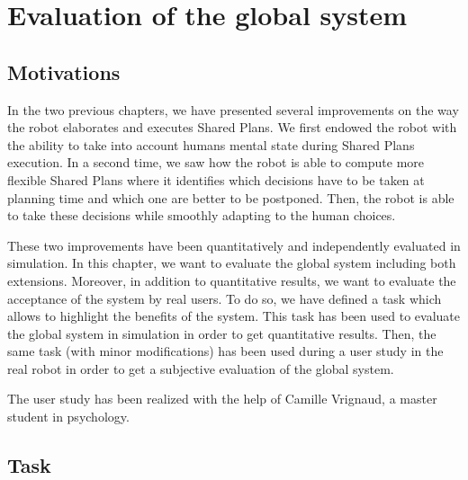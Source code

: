 \documentclass[english,a4paper,11pt,twoside]{StyleThese}
\begin{document}
\setcounter{chapter}{4} %
\dominitoc
\faketableofcontents
\fi

\chapter{Evaluation of the global system}
\minitoc

\label{ch:Eval}

\section{Motivations}

In the two previous chapters, we have presented several improvements on the way the robot elaborates and executes Shared Plans. We first endowed the robot with the ability to take into account humans mental state during Shared Plans execution. In a second time, we saw how the robot is able to compute more flexible Shared Plans where it identifies which decisions have to be taken at planning time and which one are better to be postponed. Then, the robot is able to take these decisions while smoothly adapting to the human choices. 

These two improvements have been quantitatively and independently evaluated in simulation. In this chapter, we want to evaluate the global system including both extensions. Moreover, in addition to quantitative results, we want to evaluate the acceptance of the system by real users. To do so, we have defined a task which allows to highlight the benefits of the system. This task has been used to evaluate the global system in simulation in order to get quantitative results. Then, the same task (with minor modifications) has been used during a user study in the real robot in order to get a subjective evaluation of the global system. 

The user study has been realized with the help of Camille Vrignaud, a master student in psychology.

\section{Task}

\label{sec:task_us}
\end{document}

